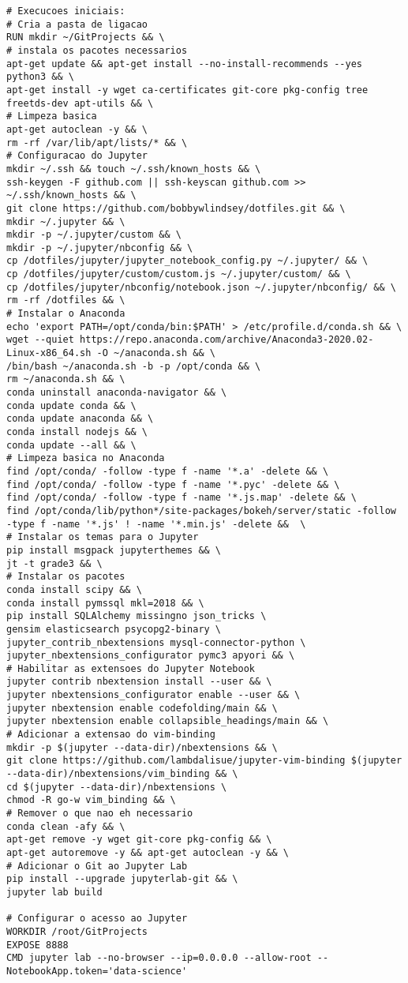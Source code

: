 \begin{lstlisting}
# Execucoes iniciais:
# Cria a pasta de ligacao
RUN mkdir ~/GitProjects && \
# instala os pacotes necessarios
apt-get update && apt-get install --no-install-recommends --yes python3 && \
apt-get install -y wget ca-certificates git-core pkg-config tree freetds-dev apt-utils && \
# Limpeza basica
apt-get autoclean -y && \
rm -rf /var/lib/apt/lists/* && \
# Configuracao do Jupyter
mkdir ~/.ssh && touch ~/.ssh/known_hosts && \
ssh-keygen -F github.com || ssh-keyscan github.com >> ~/.ssh/known_hosts && \
git clone https://github.com/bobbywlindsey/dotfiles.git && \
mkdir ~/.jupyter && \
mkdir -p ~/.jupyter/custom && \
mkdir -p ~/.jupyter/nbconfig && \
cp /dotfiles/jupyter/jupyter_notebook_config.py ~/.jupyter/ && \
cp /dotfiles/jupyter/custom/custom.js ~/.jupyter/custom/ && \
cp /dotfiles/jupyter/nbconfig/notebook.json ~/.jupyter/nbconfig/ && \
rm -rf /dotfiles && \
# Instalar o Anaconda
echo 'export PATH=/opt/conda/bin:$PATH' > /etc/profile.d/conda.sh && \
wget --quiet https://repo.anaconda.com/archive/Anaconda3-2020.02-Linux-x86_64.sh -O ~/anaconda.sh && \
/bin/bash ~/anaconda.sh -b -p /opt/conda && \
rm ~/anaconda.sh && \
conda uninstall anaconda-navigator && \
conda update conda && \
conda update anaconda && \
conda install nodejs && \
conda update --all && \
# Limpeza basica no Anaconda
find /opt/conda/ -follow -type f -name '*.a' -delete && \
find /opt/conda/ -follow -type f -name '*.pyc' -delete && \
find /opt/conda/ -follow -type f -name '*.js.map' -delete && \
find /opt/conda/lib/python*/site-packages/bokeh/server/static -follow -type f -name '*.js' ! -name '*.min.js' -delete &&  \
# Instalar os temas para o Jupyter
pip install msgpack jupyterthemes && \
jt -t grade3 && \
# Instalar os pacotes
conda install scipy && \
conda install pymssql mkl=2018 && \
pip install SQLAlchemy missingno json_tricks \
gensim elasticsearch psycopg2-binary \
jupyter_contrib_nbextensions mysql-connector-python \
jupyter_nbextensions_configurator pymc3 apyori && \
# Habilitar as extensoes do Jupyter Notebook
jupyter contrib nbextension install --user && \
jupyter nbextensions_configurator enable --user && \
jupyter nbextension enable codefolding/main && \
jupyter nbextension enable collapsible_headings/main && \
# Adicionar a extensao do vim-binding
mkdir -p $(jupyter --data-dir)/nbextensions && \
git clone https://github.com/lambdalisue/jupyter-vim-binding $(jupyter --data-dir)/nbextensions/vim_binding && \
cd $(jupyter --data-dir)/nbextensions \
chmod -R go-w vim_binding && \
# Remover o que nao eh necessario
conda clean -afy && \
apt-get remove -y wget git-core pkg-config && \
apt-get autoremove -y && apt-get autoclean -y && \
# Adicionar o Git ao Jupyter Lab
pip install --upgrade jupyterlab-git && \
jupyter lab build

# Configurar o acesso ao Jupyter
WORKDIR /root/GitProjects
EXPOSE 8888
CMD jupyter lab --no-browser --ip=0.0.0.0 --allow-root --NotebookApp.token='data-science'
\end{lstlisting}

